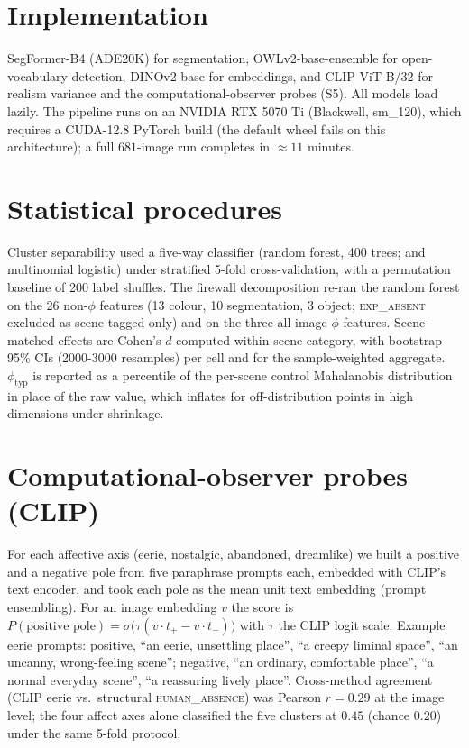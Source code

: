 \documentclass[11pt]{article}
\begin{document}
\section{Implementation}

SegFormer-B4 (ADE20K) for segmentation, OWLv2-base-ensemble for open-vocabulary detection,
DINOv2-base for embeddings, and CLIP ViT-B/32 for realism variance and the
computational-observer probes (S5). All models load lazily. The pipeline runs on an NVIDIA
RTX 5070 Ti (Blackwell, sm\_120), which requires a CUDA-12.8 PyTorch build (the default
wheel fails on this architecture); a full $681$-image run completes in $\approx 11$ minutes.

\section{Statistical procedures}

Cluster separability used a five-way classifier (random forest, 400 trees; and multinomial
logistic) under stratified 5-fold cross-validation, with a permutation baseline of 200
label shuffles. The firewall decomposition re-ran the random forest on the 26 non-$\phi$
features (13 colour, 10 segmentation, 3 object; \textsc{exp\_absent} excluded as
scene-tagged only) and on the three all-image $\phi$ features. Scene-matched effects are
Cohen's $d$ computed within scene category, with bootstrap 95\% CIs (2000-3000
resamples) per cell and for the sample-weighted aggregate. $\phi_{\text{typ}}$ is reported
as a percentile of the per-scene control Mahalanobis distribution in place of the raw value,
which inflates for off-distribution points in high dimensions under shrinkage.

\section{Computational-observer probes (CLIP)}

For each affective axis (eerie, nostalgic, abandoned, dreamlike) we built a positive and a
negative pole from five paraphrase prompts each, embedded with CLIP's text encoder, and
took each pole as the mean unit text embedding (prompt ensembling). For an image embedding
$v$ the score is $P(\text{positive pole})=\sigma\bigl(\tau(v\!\cdot\!t_+ - v\!\cdot\!t_-)\bigr)$
with $\tau$ the CLIP logit scale. Example eerie prompts: positive, ``an eerie,
unsettling place'', ``a creepy liminal space'', ``an uncanny, wrong-feeling scene'';
negative, ``an ordinary, comfortable place'', ``a normal everyday scene'', ``a
reassuring lively place''. Cross-method agreement (CLIP eerie vs.\ structural
\textsc{human\_absence}) was Pearson $r=0.29$ at the image level; the four affect axes
alone classified the five clusters at $0.45$ (chance $0.20$) under the same 5-fold protocol.
\end{document}
